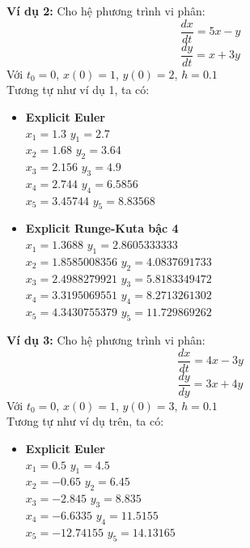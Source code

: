 \documentclass[a4paper]{article}
\begin{document}
\begin{flushleft}
    \textbf{Ví dụ 2: }
    Cho hệ phương trình vi phân: \\
        \[\frac{dx}{dt} = 5x - y\]
        \[\frac{dy}{dt} = x + 3y\]
    Với $t_0=0$, $x(0)=1$, $y(0)=2$, $h=0.1$ \\
    Tương tự như ví dụ 1, ta có:
    \begin{itemize}
        \item \textbf{Explicit Euler \\}
        $x_1=1.3$ \hspace*{3cm} $y_1=2.7$ \\
        $x_2=1.68$ \hspace*{2.83cm} $y_2=3.64$ \\
        $x_3=2.156$ \hspace*{2.65cm} $y_3=4.9$ \\
        $x_4=2.744$ \hspace*{2.65cm} $y_4=6.5856$ \\
        $x_5=3.45744$ \hspace*{2.3cm} $y_5=8.83568$
    \end{itemize}
    
    \begin{itemize}
        \item \textbf{Explicit Runge-Kuta bậc 4 \\}
        $x_1=1.3688$ \hspace*{2.48cm} $y_1=2.8605333333$ \\
        $x_2=1.8585008356$ \hspace*{1.43cm} $y_2=4.0837691733$ \\
        $x_3=2.4988279921$ \hspace*{1.43cm} $y_3=5.8183349472$ \\
        $x_4=3.3195069551$ \hspace*{1.43cm} $y_4=8.2713261302$ \\
        $x_5=4.3430755379$ \hspace*{1.43cm} $y_5=11.729869262$
    \end{itemize}
    
    \textbf{Ví dụ 3: }
    Cho hệ phương trình vi phân:
        \[\frac{dx}{dt} = 4x - 3y\]
        \[\frac{dy}{dy} = 3x + 4y\]
    Với $t_0=0$, $x(0)=1$, $y(0)=3$, $h=0.1$ \\
    Tương tự như ví dụ trên, ta có:
    \begin{itemize}
        \item \textbf{Explicit Euler \\}
        $x_1=0.5$ \hspace*{3cm} $y_1=4.5$ \\
        $x_2=-0.65$ \hspace*{2.55cm} $y_2=6.45$ \\
        $x_3=-2.845$ \hspace*{2.38cm} $y_3=8.835$ \\
        $x_4=-6.6335$ \hspace*{2.2cm} $y_4=11.5155$ \\
        $x_5=-12.74155$ \hspace*{1.85cm} $y_5=14.13165$
    \end{itemize}
    

\end{flushleft}
\end{document}
